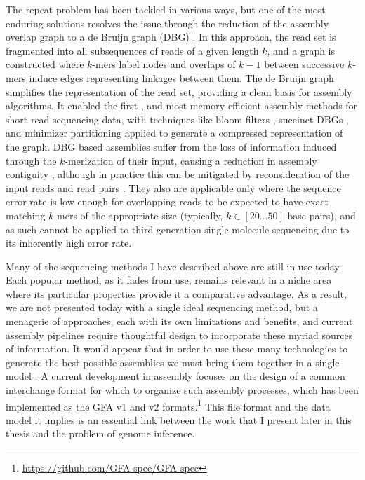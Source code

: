 \documentclass[a4paper,12pt,numbered,oneside]{Classes/PhDThesisPSnPDF}
\begin{document}
The repeat problem has been tackled in various ways, but one of the most enduring solutions resolves the issue through the reduction of the assembly overlap graph to a de Bruijn graph (DBG) \cite{pevzner2001eulerian}.
In this approach, the read set is fragmented into all subsequences of reads of a given length $k$, and a graph is constructed where $k$-mers label nodes and overlaps of $k-1$ between successive $k$-mers induce edges representing linkages between them.
The de Bruijn graph simplifies the representation of the read set, providing a clean basis for assembly algorithms.
It enabled the first \cite{zerbino2008velvet,simpson2009abyss,iqbal2012novo}, and most memory-efficient assembly methods for short read sequencing data, with techniques like bloom filters \cite{chikhi2013space}, succinct DBGs \cite{bowe2012succinct,li2015megahit}, and minimizer partitioning \cite{chikhi2016compacting} applied to generate a compressed representation of the graph.
DBG based assemblies suffer from the loss of information induced through the $k$-merization of their input, causing a reduction in assembly contiguity \cite{earl2011assemblathon}, although in practice this can be mitigated by reconsideration of the input reads and read pairs \cite{butler2008allpaths}.
They also are applicable only where the sequence error rate is low enough for overlapping reads to be expected to have exact matching $k$-mers of the appropriate size (typically, $k \in [20 \ldots 50]$ base pairs), and as such cannot be applied to third generation single molecule sequencing due to its inherently high error rate.

Many of the sequencing methods I have described above are still in use today.
Each popular method, as it fades from use, remains relevant in a niche area where its particular properties provide it a comparative advantage.
As a result, we are not presented today with a single ideal sequencing method, but a menagerie of approaches, each with its own limitations and benefits, and current assembly pipelines require thoughtful design to incorporate these myriad sources of information.
It would appear that in order to use these many technologies to generate the best-possible assemblies we must bring them together in a single model \cite{chaisson2018multi}.
A current development in assembly focuses on the design of a common interchange format for which to organize such assembly processes, which has been implemented as the GFA v1 and v2 formats.\footnote{\url{https://github.com/GFA-spec/GFA-spec}}
This file format and the data model it implies is an essential link between the work that I present later in this thesis and the problem of genome inference.
\end{document}
